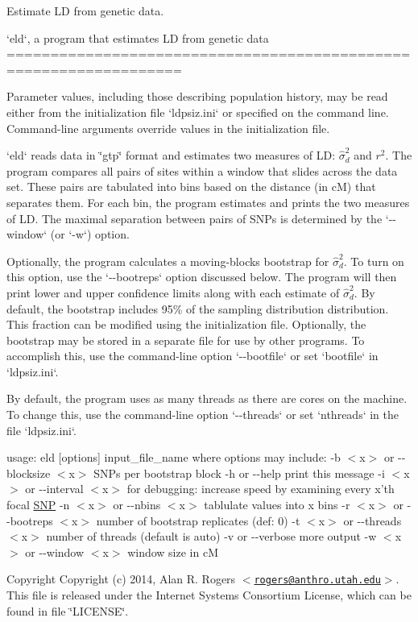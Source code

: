 \-Estimate \-L\-D from genetic data.

`eld`, a program that estimates \-L\-D from genetic data ==================================================================

\-Parameter values, including those describing population history, may be read either from the initialization file `ldpsiz.ini` or specified on the command line. \-Command-\/line arguments override values in the initialization file.

`eld` reads data in \char`\"{}gtp\char`\"{} format and estimates two measures of \-L\-D\-: $\hat\sigma_d^2$ and $r^2$. \-The program compares all pairs of sites within a window that slides across the data set. \-These pairs are tabulated into bins based on the distance (in c\-M) that separates them. \-For each bin, the program estimates and prints the two measures of \-L\-D. \-The maximal separation between pairs of \-S\-N\-Ps is determined by the `-\/-\/window` (or `-\/w`) option.

\-Optionally, the program calculates a moving-\/blocks bootstrap for $\hat\sigma_d^2$. \-To turn on this option, use the `-\/-\/bootreps` option discussed below. \-The program will then print lower and upper confidence limits along with each estimate of $\hat\sigma_d^2$. \-By default, the bootstrap includes 95\% of the sampling distribution distribution. \-This fraction can be modified using the initialization file. \-Optionally, the bootstrap may be stored in a separate file for use by other programs. \-To accomplish this, use the command-\/line option `-\/-\/bootfile` or set `bootfile` in `ldpsiz.ini`.

\-By default, the program uses as many threads as there are cores on the machine. \-To change this, use the command-\/line option `-\/-\/threads` or set `nthreads` in the file `ldpsiz.ini`.

usage\-: eld \mbox{[}options\mbox{]} input\-\_\-file\-\_\-name where options may include\-: -\/b $<$x$>$ or -\/-\/blocksize $<$x$>$ \-S\-N\-Ps per bootstrap block -\/h or -\/-\/help print this message -\/i $<$x$>$ or -\/-\/interval $<$x$>$ for debugging\-: increase speed by examining every x'th focal \hyperlink{struct_s_n_p}{\-S\-N\-P} -\/n $<$x$>$ or -\/-\/nbins $<$x$>$ tablulate values into x bins -\/r $<$x$>$ or -\/-\/bootreps $<$x$>$ number of bootstrap replicates (def\-: 0) -\/t $<$x$>$ or -\/-\/threads $<$x$>$ number of threads (default is auto) -\/v or -\/-\/verbose more output -\/w $<$x$>$ or -\/-\/window $<$x$>$ window size in c\-M

\begin{DoxyCopyright}{\-Copyright}
\-Copyright (c) 2014, \-Alan \-R. \-Rogers $<$\href{mailto:rogers@anthro.utah.edu}{\tt rogers@anthro.\-utah.\-edu}$>$. \-This file is released under the \-Internet \-Systems \-Consortium \-License, which can be found in file \char`\"{}\-L\-I\-C\-E\-N\-S\-E\char`\"{}. 
\end{DoxyCopyright}
